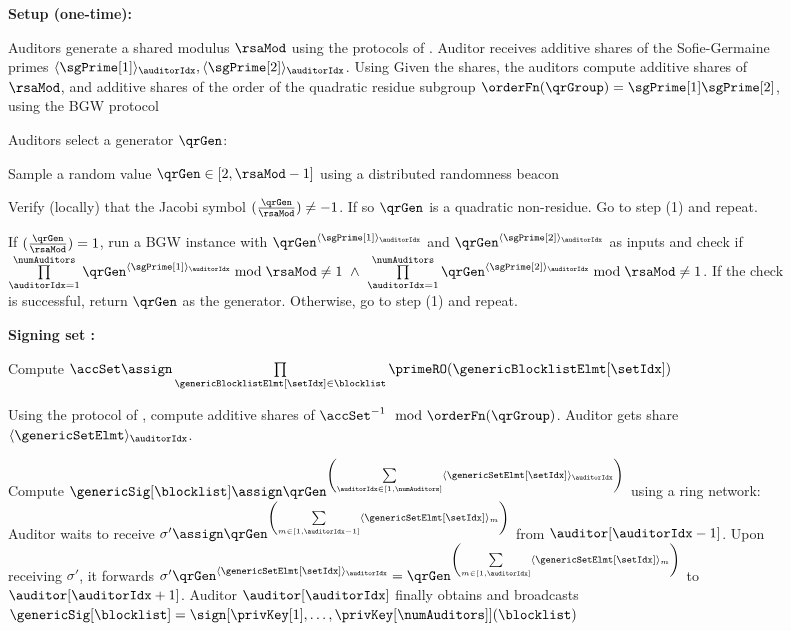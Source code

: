 \begin{figure}[h]
{\begin{minipage}[t]{\textwidth}
\smallskip\noindent\textbf{Setup (one-time):}

\itemListStart
\item Auditors generate a shared modulus $\rsaMod$ using the protocols of \citet{algesheimer2002efficient,ong2005optimizing}. Auditor \auditor[\auditorIdx] receives additive shares of the Sofie-Germaine primes $\langle \sgPrime[1] \rangle_{\auditorIdx}, \langle \sgPrime[2] \rangle_{\auditorIdx}$. Using Given the shares, the auditors compute additive shares of $\rsaMod$, and additive shares of the order of the quadratic residue subgroup $\orderFn(\qrGroup) = \sgPrime[1] \sgPrime[2]$, using the BGW protocol~\cite{asharov2017full}

\item Auditors select a generator $\qrGen$: 
\enumListStart
\item Sample a random value $\qrGen \in [2, \rsaMod-1]$ using a distributed randomness beacon~\cite{choi2023sok}
\item Verify (locally) that the Jacobi symbol $(\frac{\qrGen}{\rsaMod}) \neq -1$. If so $\qrGen$ is a quadratic non-residue. Go to step (1) and repeat.  
\item If $(\frac{\qrGen}{\rsaMod}) = 1$, run a BGW instance with $\qrGen^{\langle \sgPrime[1] \rangle_{\auditorIdx}}$ and $\qrGen^{\langle \sgPrime[2] \rangle_{\auditorIdx}}$ as inputs and check if $ \prod\limits_{\auditorIdx = 1}^{\numAuditors} \qrGen^{\langle \sgPrime[1] \rangle_{\auditorIdx}} \bmod \rsaMod \neq 1 ~\land ~\prod\limits_{\auditorIdx = 1}^{\numAuditors} \qrGen^{\langle \sgPrime[2] \rangle_{\auditorIdx}} \bmod \rsaMod \neq 1$. If the check is successful, return $\qrGen$ as the generator. Otherwise, go to step (1) and repeat. 
\enumListEnd
\itemListEnd

\smallskip\noindent\textbf{Signing set \blocklist:}

\enumListStart
\item Compute $\accSet \assign \prod\limits_{\genericBlocklistElmt[\setIdx] \in \blocklist} \primeRO(\genericBlocklistElmt[\setIdx])$ 
\enumListStart
\item Using the protocol of \citet[Fig 3]{catalano2000computing}, compute additive shares of $\accSet^{-1} \mod \orderFn(\qrGroup)$. Auditor \auditor[\auditorIdx] gets share $\langle \genericSetElmt\rangle_{\auditorIdx}$.
\item Compute $\genericSig[\blocklist] \assign \qrGen^{\left(\sum\limits_{\auditorIdx \in [1, \numAuditors]} \langle \genericSetElmt[\setIdx] \rangle_{\auditorIdx}\right)}$ using a ring network: Auditor \auditor[\auditorIdx] waits to receive $\sigma' \assign \qrGen^{\left(\sum\limits_{m \in [1, \auditorIdx - 1]} \langle \genericSetElmt[\setIdx] \rangle_{m}\right)}$ from $\auditor[\auditorIdx - 1]$. Upon receiving $\sigma'$, it forwards $\sigma' \qrGen^{\langle \genericSetElmt[\setIdx] \rangle_{\auditorIdx}} =  \qrGen^{\left(\sum\limits_{m \in [1, \auditorIdx ]} \langle \genericSetElmt[\setIdx] \rangle_{m}\right)}$ to $\auditor[\auditorIdx + 1]$. Auditor $\auditor[\auditorIdx]$ finally obtains and broadcasts $\genericSig[\blocklist] = \sign[\privKey[1],  \dots, \privKey[\numAuditors]](\blocklist)$



\end{minipage}}
\end{figure}

